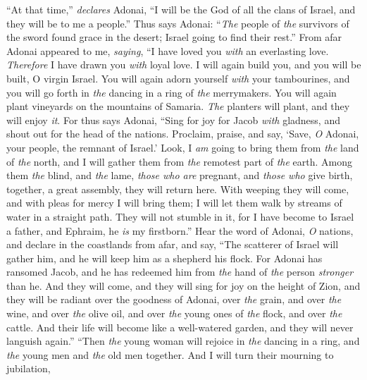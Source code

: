 \begin{biblechapter} %
\verse “At that time,” \textit{declares} Adonai, “I will be the God of all the clans of Israel, 
and they will be to me a people.”
\verse Thus says Adonai:
\verse “\textit{The} people of \textit{the} survivors of the sword found grace in the desert; 
Israel going to find their rest.”
\verse From afar Adonai appeared to me, \textit{saying}, 
“I have loved you \textit{with} an everlasting love. 
\textit{Therefore} I have drawn you \textit{with} loyal love.
\verse I will again build you, 
and you will be built, O virgin Israel. 
You will again adorn yourself \textit{with} your tambourines, 
and you will go forth in \textit{the} dancing in a ring of \textit{the} merrymakers.
\verse You will again plant vineyards on the mountains of Samaria. 
\textit{The} planters will plant, and they will enjoy \textit{it}.
\verse For thus says Adonai,
\verse “Sing for joy for Jacob \textit{with} gladness, 
and shout out for the head of the nations. 
Proclaim, praise, and say, 
‘Save, \textit{O} Adonai, your people, the remnant of Israel.’
\verse Look, I \textit{am} going to bring them from \textit{the} land of \textit{the} north, 
and I will gather them from \textit{the} remotest part of \textit{the} earth. 
Among them \textit{the} blind, and \textit{the} lame, 
\textit{those who are} pregnant, and \textit{those who} give birth, 
together, a great assembly, 
they will return here.
\verse With weeping they will come, 
and with pleas for mercy I will bring them; 
I will let them walk by streams of water in a straight path. 
They will not stumble in it, 
for I have become to Israel a father, 
and Ephraim, he \textit{is} my firstborn.”
\verse Hear the word of Adonai, \textit{O} nations, 
and declare in the coastlands from afar, and say, 
“The scatterer of Israel will gather him, 
and he will keep him as a shepherd his flock.
\verse For Adonai has ransomed Jacob, 
and he has redeemed him from \textit{the} hand of \textit{the} person \textit{stronger} than he.
\verse And they will come, 
and they will sing for joy on the height of Zion, 
and they will be radiant over the goodness of Adonai, 
over \textit{the} grain, and over \textit{the} wine, and over \textit{the} olive oil, 
and over \textit{the} young ones of \textit{the} flock, and over \textit{the} cattle. 
And their life will become like a well-watered garden, 
and they will never languish again.”
\verse “Then \textit{the} young woman will rejoice in \textit{the} dancing in a ring, 
and \textit{the} young men and \textit{the} old men together. 
And I will turn their mourning to jubilation, 

\end{biblechapter}
